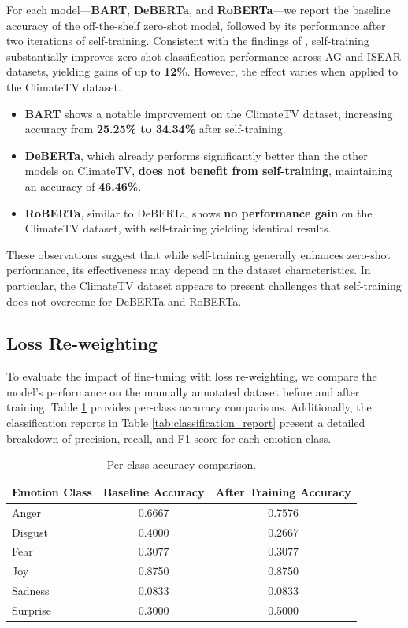 For each model—\textbf{BART}, \textbf{DeBERTa}, and \textbf{RoBERTa}—we report the baseline accuracy of the off-the-shelf zero-shot model, followed by its performance after two iterations of self-training. Consistent with the findings of \citet{gera_zero-shot_2022}, self-training substantially improves zero-shot classification performance across AG and ISEAR datasets, yielding gains of up to \textbf{12\%}. However, the effect varies when applied to the ClimateTV dataset.

\begin{itemize}
    \item \textbf{BART} shows a notable improvement on the ClimateTV dataset, increasing accuracy from \textbf{25.25\% to 34.34\%} after self-training.
    \item \textbf{DeBERTa}, which already performs significantly better than the other models on ClimateTV, \textbf{does not benefit from self-training}, maintaining an accuracy of \textbf{46.46\%}.
    \item \textbf{RoBERTa}, similar to DeBERTa, shows \textbf{no performance gain} on the ClimateTV dataset, with self-training yielding identical results.
\end{itemize}

These observations suggest that while self-training generally enhances zero-shot performance, its effectiveness may depend on the dataset characteristics. In particular, the ClimateTV dataset appears to present challenges that self-training does not overcome for DeBERTa and RoBERTa.


\subsection{Loss Re-weighting}

To evaluate the impact of fine-tuning with loss re-weighting, we compare the model's performance on the manually annotated dataset before and after training. Table \ref{tab:per_class} provides per-class accuracy comparisons. Additionally, the classification reports in Table \ref{tab:classification_report} present a detailed breakdown of precision, recall, and F1-score for each emotion class.
\newline

\begin{table}[h]
    \centering
    \begin{tabular}{lcc}
        \hline
        \textbf{Emotion Class} & \textbf{Baseline Accuracy} & \textbf{After Training Accuracy} \\
        \hline
        Anger & 0.6667 & 0.7576 \\
        Disgust & 0.4000 & 0.2667 \\
        Fear & 0.3077 & 0.3077 \\
        Joy & 0.8750 & 0.8750 \\
        Sadness & 0.0833 & 0.0833 \\
        Surprise & 0.3000 & 0.5000 \\
        \hline
    \end{tabular}
    \caption{Per-class accuracy comparison.}
    \label{tab:per_class}
\end{table}

